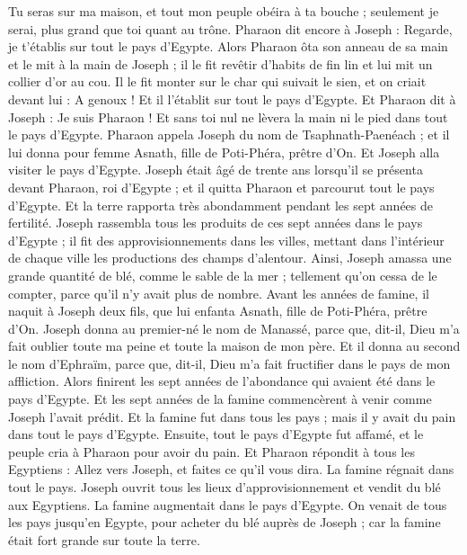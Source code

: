 \begin{multicols}{2}
Tu seras sur ma maison, et tout mon peuple obéira à ta bouche ; seulement je serai, plus grand que toi quant au trône.
Pharaon dit encore à Joseph : Regarde, je t'établis sur tout le pays d'Egypte.
Alors Pharaon ôta son anneau de sa main et le mit à la main de Joseph ; il le fit revêtir d'habits de fin lin et lui mit un collier d'or au cou.
Il le fit monter sur le char qui suivait le sien, et on criait devant lui : A genoux ! Et il l'établit sur tout le pays d'Egypte.
Et Pharaon dit à Joseph : Je suis Pharaon ! Et sans toi nul ne lèvera la main ni le pied dans tout le pays d'Egypte.
Pharaon appela Joseph du nom de Tsaphnath-Paenéach ; et il lui donna pour femme Asnath, fille de Poti-Phéra, prêtre d'On. Et Joseph alla visiter le pays d'Egypte.
Joseph était âgé de trente ans lorsqu'il se présenta devant Pharaon, roi d'Egypte ; et il quitta Pharaon et parcourut tout le pays d'Egypte.
Et la terre rapporta très abondamment pendant les sept années de fertilité.
Joseph rassembla tous les produits de ces sept années dans le pays d'Egypte ; il fit des approvisionnements dans les villes, mettant dans l'intérieur de chaque ville les productions des champs d'alentour.
Ainsi, Joseph amassa une grande quantité de blé, comme le sable de la mer ; tellement qu'on cessa de le compter, parce qu'il n'y avait plus de nombre.
Avant les années de famine, il naquit à Joseph deux fils, que lui enfanta Asnath, fille de Poti-Phéra, prêtre d'On.
Joseph donna au premier-né le nom de Manassé, parce que, dit-il, Dieu m'a fait oublier toute ma peine et toute la maison de mon père.
Et il donna au second le nom d'Ephraïm, parce que, dit-il, Dieu m'a fait fructifier dans le pays de mon affliction.
Alors finirent les sept années de l'abondance qui avaient été dans le pays d'Egypte.
Et les sept années de la famine commencèrent à venir comme Joseph l'avait prédit. Et la famine fut dans tous les pays ; mais il y avait du pain dans tout le pays d'Egypte.
Ensuite, tout le pays d'Egypte fut affamé, et le peuple cria à Pharaon pour avoir du pain. Et Pharaon répondit à tous les Egyptiens : Allez vers Joseph, et faites ce qu'il vous dira.
La famine régnait dans tout le pays. Joseph ouvrit tous les lieux d'approvisionnement et vendit du blé aux Egyptiens. La famine augmentait dans le pays d'Egypte.
On venait de tous les pays jusqu'en Egypte, pour acheter du blé auprès de Joseph ; car la famine était fort grande sur toute la terre.

\end{multicols}
